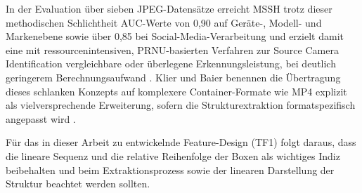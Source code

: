 In der Evaluation über sieben JPEG-Datensätze erreicht MSSH trotz dieser methodischen Schlichtheit AUC-Werte von 0,90 auf Geräte-, Modell- und Markenebene sowie über 0,85 bei Social-Media-Verarbeitung und erzielt damit eine mit ressourcenintensiven, PRNU-basierten Verfahren zur Source Camera Identification vergleichbare oder überlegene Erkennungsleistung, bei deutlich geringerem Berechnungsaufwand \cite[Kap. 4.4]{klier_media_2025}. Klier und Baier benennen die Übertragung dieses schlanken Konzepts auf komplexere Container-Formate wie MP4 explizit als vielversprechende Erweiterung, sofern die Strukturextraktion formatspezifisch angepasst wird \cite[Kap. 5]{klier_media_2025}.

Für das in dieser Arbeit zu entwickelnde Feature-Design (TF1) folgt daraus, dass die lineare Sequenz und die relative Reihenfolge der Boxen als wichtiges Indiz beibehalten und beim Extraktionsprozess sowie der linearen Darstellung der Struktur beachtet werden sollten.

